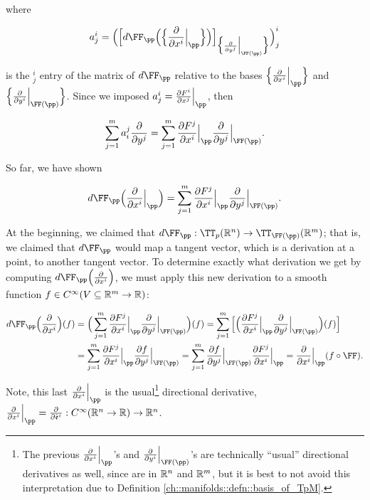 \begin{defn}
    where  
    
    \begin{align*}
        a^i_j = \Big( \Big[ d\FF_\pp \Big( \Big\{ \frac{\pd}{\pd x^i} \Big|_\pp \Big\} \Big) \Big]_{\Big\{ \frac{\pd}{\pd y^j} \Big|_{\FF(\pp)} \Big\}} \Big)^i_j
    \end{align*}
    
    is the $^i_j$ entry of the matrix of $d\FF_\pp$ relative to the bases $\Big\{ \frac{\pd}{\pd x^i} \Big|_\pp \Big\}$ and $\Big\{ \frac{\pd}{\pd y^i} \Big|_{\FF(\pp)} \Big\}$. Since we imposed $a^i_j = \frac{\pd F^i}{\pd x^j}\Big|_\pp$, then
    
    \begin{align*}
       \sum_{j = 1}^m a^j_i \frac{\pd}{\pd y^j} = \sum_{j = 1}^m \frac{\pd F^j}{\pd x^i}\Big|_\pp \frac{\pd}{\pd y^j}\Big|_{\FF(\pp)}.
    \end{align*}
    
    So far, we have shown 
    
    \begin{align*}
        d\FF_\pp \Big( \frac{\pd}{\pd x^i}\Big|_\pp \Big) = \sum_{j = 1}^m \frac{\pd F^j}{\pd x^i}\Big|_\pp \frac{\pd}{\pd y^j}\Big|_{\FF(\pp)}.
    \end{align*}
    
    At the beginning, we claimed that $d\FF_\pp:\TT_p(\R^n) \rightarrow \TT_{\FF(\pp)}(\R^m)$; that is, we claimed that $d\FF_\pp$ would map a tangent vector, which is a derivation at a point, to another tangent vector. To determine exactly what derivation we get by computing $d\FF_\pp \Big( \frac{\pd}{\pd x^i} \Big)$, we must apply this new derivation to a smooth function $f \in C^\infty(V \subseteq \mathbb{R}^m \rightarrow \mathbb{R})$:
    
    \begin{align*}
        d\FF_\pp \Big( \frac{\pd}{\pd x^i} \Big)(f)
        &= 
        \Big( \sum_{j = 1}^m \frac{\pd F^j}{\pd x^i}\Big|_\pp \frac{\pd}{\pd y^j}\Big|_{\FF(\pp)} \Big) (f) 
        = 
        \sum_{j = 1}^m \Big[ \Big( \frac{\pd F^j}{\pd x^i}\Big|_\pp \frac{\pd}{\pd y^j}\Big|_{\FF(\pp)}\Big)(f) \Big] \\
        &= 
        \sum_{j = 1}^m \frac{\pd F^j}{\pd x^i}\Big|_\pp \frac{\pd f}{\pd y^j}\Big|_{\FF(\pp)}
        =
        \sum_{j = 1}^m \frac{\pd f}{\pd y^j}\Big|_{\FF(\pp)} \frac{\pd F^j}{\pd x^i}\Big|_\pp
        = \frac{\pd}{\pd x^i}\Big|_\pp (f \circ \FF).
    \end{align*}
    
    Note, this last $\frac{\pd}{\pd x^i}\Big|_\pp$ is the usual\footnote{The previous $\frac{\pd}{\pd x^i}\Big|_\pp$'s and $\frac{\pd}{\pd y^i}\Big|_{\FF(\pp)}$'s are technically ``usual'' directional derivatives as well, since are in $\mathbb{R}^n$ and $\mathbb{R}^m$, but it is best to not avoid this interpretation due to Definition \ref{ch::manifolds::defn::basis_of_TpM}.} directional derivative, $\frac{\pd}{\pd x^i}\Big|_\pp = \frac{\pd}{\pd \see^i}:C^\infty(\R^n \rightarrow \R) \rightarrow \R^n$. 
    

\end{defn}
